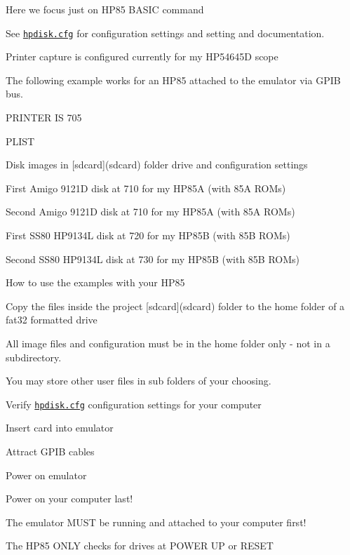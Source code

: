 \begin{DoxyItemize}
\item Here we focus just on H\+P85 B\+A\+S\+IC command
\item See \href{hpdisk/hpdisk.cfg}{\tt hpdisk.\+cfg} for configuration settings and setting and documentation.
\begin{DoxyItemize}
\item Printer capture is configured currently for my H\+P54645D scope
\begin{DoxyItemize}
\item The following example works for an H\+P85 attached to the emulator via G\+P\+IB bus.
\begin{DoxyItemize}
\item P\+R\+I\+N\+T\+ER IS 705
\item P\+L\+I\+ST
\end{DoxyItemize}
\end{DoxyItemize}
\item Disk images in \mbox{[}sdcard\mbox{]}(sdcard) folder drive and configuration settings
\begin{DoxyItemize}
\item First Amigo 9121D disk at 710 for my H\+P85A (with 85A R\+O\+Ms)
\item Second Amigo 9121D disk at 710 for my H\+P85A (with 85A R\+O\+Ms)
\item First S\+S80 H\+P9134L disk at 720 for my H\+P85B (with 85B R\+O\+Ms)
\item Second S\+S80 H\+P9134L disk at 730 for my H\+P85B (with 85B R\+O\+Ms)
\end{DoxyItemize}
\item How to use the examples with your H\+P85
\begin{DoxyItemize}
\item Copy the files inside the project \mbox{[}sdcard\mbox{]}(sdcard) folder to the home folder of a fat32 formatted drive
\begin{DoxyItemize}
\item All image files and configuration must be in the home folder only -\/ not in a subdirectory.
\item You may store other user files in sub folders of your choosing.
\end{DoxyItemize}
\item Verify \href{sdcard/hpdisk.cfg}{\tt hpdisk.\+cfg} configuration settings for your computer
\item Insert card into emulator
\item Attract G\+P\+IB cables
\item Power on emulator
\item Power on your computer last!
\begin{DoxyItemize}
\item The emulator M\+U\+ST be running and attached to your computer first!
\item The H\+P85 O\+N\+LY checks for drives at P\+O\+W\+ER UP or R\+E\+S\+ET
\end{DoxyItemize}
\end{DoxyItemize}
\end{DoxyItemize}
\end{DoxyItemize}

